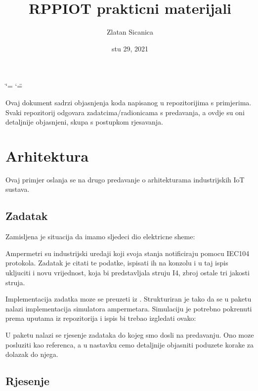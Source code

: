 \documentclass[letterpaper,10pt,croatian]{sphinxmanual}
\title{RPPIOT prakticni materijali}
\date{stu 29, 2021}
\author{Zlatan Sicanica}
\begin{document}
\ifdefined\shorthandoff
  \ifnum\catcode`\=\string=\active\shorthandoff{=}\fi
  \ifnum\catcode`\"=\active{}\fi
\fi

\pagestyle{empty}
\sphinxmaketitle
\pagestyle{plain}
\sphinxtableofcontents
\pagestyle{normal}
\label{\detokenize{index::doc}}


\sphinxAtStartPar
Ovaj dokument sadrzi objasnjenja koda napisanog u repozitorijima s primjerima.
Svaki repozitorij odgovara zadatcima/radionicama s predavanja, a ovdje su oni
detaljnije objasnjeni, skupa s postupkom rjesavanja.


\chapter{Arhitektura}
\label{\detokenize{01-architecture/index:arhitektura}}\label{\detokenize{01-architecture/index::doc}}
\sphinxAtStartPar
Ovaj primjer oslanja se na drugo predavanje o arhitekturama industrijskih IoT
sustava.


\section{Zadatak}
\label{\detokenize{01-architecture/index:zadatak}}
\sphinxAtStartPar
Zamisljena je situacija da imamo sljedeci dio elektricne sheme:

\noindent{}

\sphinxAtStartPar
Ampermetri su industrijski uredaji koji svoja stanja notificiraju pomocu IEC104
protokola. Zadatak je citati te podatke, ispisati ih na konzolu i u taj ispis
ukljuciti i novu vrijednost, koja bi predstavljala struju I4, zbroj ostale tri
jakosti struja.

\sphinxAtStartPar
Implementacija zadatka moze se preuzeti iz . Strukturiran je tako da se u
paketu  nalazi implementacija simulatora ampermetara. Simulaciju
je potrebno pokrenuti prema uputama iz repozitorija i ispis bi trebao izgledati
ovako:

\noindent{}

\sphinxAtStartPar
U paketu  nalazi se rjesenje zadataka do kojeg smo dosli na
predavanju. Ono moze posluziti kao referenca, a u nastavku cemo detaljnije
objasniti poduzete korake za dolazak do njega.


\section{Rjesenje}
\label{\detokenize{01-architecture/index:rjesenje}}
\end{document}
